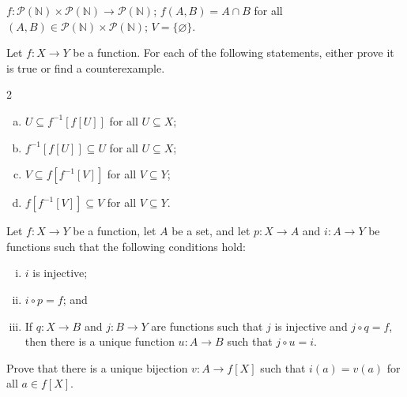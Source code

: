 \begin{chapex}
\label{cqComputePreimageEnd}
$f : \mathcal{P}(\mathbb{N}) \times \mathcal{P}(\mathbb{N}) \to \mathcal{P}(\mathbb{N})$; $f(A,B) = A \cap B$ for all $(A,B) \in \mathcal{P}(\mathbb{N}) \times \mathcal{P}(\mathbb{N})$; $V = \{ \varnothing \}$.
\end{chapex}

\begin{chapex}
Let $f : X \to Y$ be a function. For each of the following statements, either prove it is true or find a counterexample.
\begin{multicols}{2}
\begin{enumerate}[(a)]
\item $U \subseteq f^{-1}[f[U]]$ for all $U \subseteq X$;
\item $f^{-1}[f[U]] \subseteq U$ for all $U \subseteq X$;
\item $V \subseteq f[f^{-1}[V]]$ for all $V \subseteq Y$;
\item $f[f^{-1}[V]] \subseteq V$ for all $V \subseteq Y$.
\end{enumerate}
\end{multicols}
\end{chapex}

\begin{chapex}
Let $f : X \to Y$ be a function, let $A$ be a set, and let $p : X \to A$ and $i : A \to Y$ be functions such that the following conditions hold:
\begin{enumerate}[(i)]
\item $i$ is injective;
\item $i \circ p = f$; and
\item If $q : X \to B$ and $j : B \to Y$ are functions such that $j$ is injective and $j \circ q = f$, then there is a unique function $u : A \to B$ such that $j \circ u = i$.
\end{enumerate}
Prove that there is a unique bijection $v : A \to f[X]$ such that $i(a)=v(a)$ for all $a \in f[X]$.
\end{chapex}

